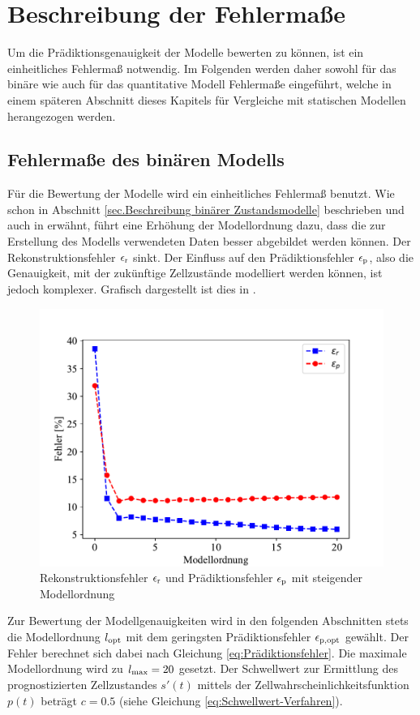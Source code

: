 \section{Beschreibung der Fehlermaße}
\label{sec.Beschreibung der Fehlermaße}
Um die Prädiktionsgenauigkeit der Modelle bewerten zu können, ist ein einheitliches Fehlermaß notwendig. Im Folgenden werden daher sowohl für das binäre wie auch für das quantitative Modell Fehlermaße eingeführt, welche in einem späteren Abschnitt dieses Kapitels für Vergleiche mit statischen Modellen herangezogen werden.
\subsection{Fehlermaße des binären Modells}
\label{sec.Fehlermaße binäres Modell}
Für die Bewertung der Modelle wird ein einheitliches Fehlermaß benutzt. Wie schon in Abschnitt \ref{sec.Beschreibung binärer Zustandsmodelle} beschrieben und auch in \cite{Krajnik.2014} erwähnt, führt eine Erhöhung der Modellordnung dazu, dass die zur Erstellung des Modells verwendeten Daten besser abgebildet werden können. Der Rekonstruktionsfehler $\epsilon_{\mathrm{r}}$ sinkt. Der Einfluss auf den Prädiktionsfehler $\epsilon_{\mathrm{p}}$, also die Genauigkeit, mit der zukünftige Zellzustände modelliert werden können, ist jedoch komplexer.
Grafisch dargestellt ist dies in .
\begin{figure}[!h]
	\centering
	\includegraphics[width=0.7\linewidth]{Abbildungen/evaluation/prediction_vs_estimation_error}
	\caption{Rekonstruktionsfehler $\epsilon_{\mathrm{r}}$ und Prädiktionsfehler $\epsilon_{\mathrm{p}}$ mit steigender Modellordnung}
	\label{fig.prediction_vs_estimation_error}
\end{figure}

Zur Bewertung der Modellgenauigkeiten wird in den folgenden Abschnitten stets die Modellordnung $l_{\mathrm{opt}}$ mit dem geringsten Prädiktionsfehler $\epsilon_{\mathrm{p,opt}}$ gewählt. Der Fehler berechnet sich dabei nach Gleichung \ref{eq:Prädiktionsfehler}. Die maximale Modellordnung wird zu $l_{\mathrm{max}} = 20$ gesetzt. Der Schwellwert zur Ermittlung des prognostizierten Zellzustandes $s'(t)$ mittels der Zellwahrscheinlichkeitsfunktion $p(t)$ beträgt $c = 0.5$ (siehe Gleichung \ref{eq:Schwellwert-Verfahren}).

